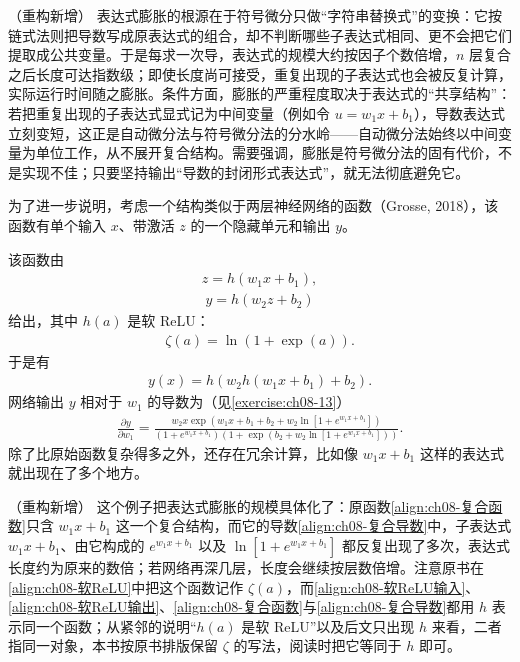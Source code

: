 \documentclass[../../main.tex]{subfiles}
\begin{document}
\begin{remark}（重构新增）
表达式膨胀的根源在于符号微分只做“字符串替换式”的变换：它按链式法则把导数写成原表达式的组合，却不判断哪些子表达式相同、更不会把它们提取成公共变量。于是每求一次导，表达式的规模大约按因子个数倍增，$n$ 层复合之后长度可达指数级；即使长度尚可接受，重复出现的子表达式也会被反复计算，实际运行时间随之膨胀。条件方面，膨胀的严重程度取决于表达式的“共享结构”：若把重复出现的子表达式显式记为中间变量（例如令 $u=w_1x+b_1$），导数表达式立刻变短，这正是自动微分法与符号微分法的分水岭——自动微分法始终以中间变量为单位工作，从不展开复合结构。需要强调，膨胀是符号微分法的固有代价，不是实现不佳；只要坚持输出“导数的封闭形式表达式”，就无法彻底避免它。
\end{remark}

为了进一步说明，考虑一个结构类似于两层神经网络的函数（Grosse, 2018），该函数有单个输入 $x$、带激活 $z$ 的一个隐藏单元和输出 $y$。

\begin{example}\label{example:ch08-表达式膨胀}
该函数由
\begin{align}
z=h\left(w_1x+b_1\right),
\label{align:ch08-软ReLU输入}
\end{align}
\begin{align}
y=h\left(w_2z+b_2\right)
\label{align:ch08-软ReLU输出}
\end{align}
给出，其中 $h(a)$ 是软 ReLU：
\begin{align}
\zeta(a)=\ln\left(1+\exp(a)\right).
\label{align:ch08-软ReLU}
\end{align}
于是有
\begin{align}
y(x)=h\left(w_2h\left(w_1x+b_1\right)+b_2\right).
\label{align:ch08-复合函数}
\end{align}
网络输出 $y$ 相对于 $w_1$ 的导数为（见\cref{exercise:ch08-13}）
\begin{align}
\frac{\partial y}{\partial w_1}=
\frac{w_2x\exp\left(w_1x+b_1+b_2+w_2\ln\left[1+e^{w_1x+b_1}\right]\right)}
{\left(1+e^{w_1x+b_1}\right)\left(1+\exp\left(b_2+w_2\ln\left[1+e^{w_1x+b_1}\right]\right)\right)}.
\label{align:ch08-复合导数}
\end{align}
除了比原始函数复杂得多之外，还存在冗余计算，比如像 $w_1x+b_1$ 这样的表达式就出现在了多个地方。
\end{example}

\begin{remark}（重构新增）
这个例子把表达式膨胀的规模具体化了：原函数\eqref{align:ch08-复合函数}只含 $w_1x+b_1$ 这一个复合结构，而它的导数\eqref{align:ch08-复合导数}中，子表达式 $w_1x+b_1$、由它构成的 $e^{w_1x+b_1}$ 以及 $\ln\left[1+e^{w_1x+b_1}\right]$ 都反复出现了多次，表达式长度约为原来的数倍；若网络再深几层，长度会继续按层数倍增。注意原书在\eqref{align:ch08-软ReLU}中把这个函数记作 $\zeta(a)$，而\eqref{align:ch08-软ReLU输入}、\eqref{align:ch08-软ReLU输出}、\eqref{align:ch08-复合函数}与\eqref{align:ch08-复合导数}都用 $h$ 表示同一个函数；从紧邻的说明“$h(a)$ 是软 ReLU”以及后文只出现 $h$ 来看，二者指同一对象，本书按原书排版保留 $\zeta$ 的写法，阅读时把它等同于 $h$ 即可。
\end{remark}
\end{document}
